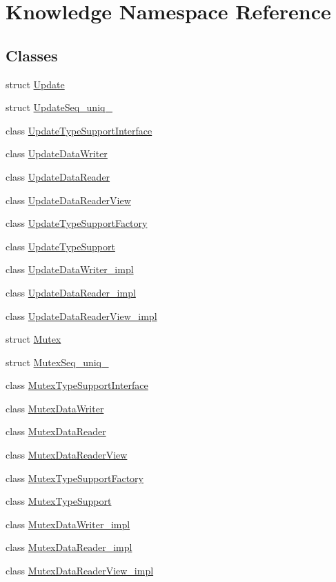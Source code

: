 \hypertarget{namespaceKnowledge}{
\section{Knowledge Namespace Reference}
\label{da/d50/namespaceKnowledge}
}
\subsection*{Classes}
\begin{DoxyCompactItemize}
\item 
struct \hyperlink{structKnowledge_1_1Update}{Update}
\item 
struct \hyperlink{structKnowledge_1_1UpdateSeq__uniq__}{UpdateSeq\_\-uniq\_\-}
\item 
class \hyperlink{classKnowledge_1_1UpdateTypeSupportInterface}{UpdateTypeSupportInterface}
\item 
class \hyperlink{classKnowledge_1_1UpdateDataWriter}{UpdateDataWriter}
\item 
class \hyperlink{classKnowledge_1_1UpdateDataReader}{UpdateDataReader}
\item 
class \hyperlink{classKnowledge_1_1UpdateDataReaderView}{UpdateDataReaderView}
\item 
class \hyperlink{classKnowledge_1_1UpdateTypeSupportFactory}{UpdateTypeSupportFactory}
\item 
class \hyperlink{classKnowledge_1_1UpdateTypeSupport}{UpdateTypeSupport}
\item 
class \hyperlink{classKnowledge_1_1UpdateDataWriter__impl}{UpdateDataWriter\_\-impl}
\item 
class \hyperlink{classKnowledge_1_1UpdateDataReader__impl}{UpdateDataReader\_\-impl}
\item 
class \hyperlink{classKnowledge_1_1UpdateDataReaderView__impl}{UpdateDataReaderView\_\-impl}
\item 
struct \hyperlink{structKnowledge_1_1Mutex}{Mutex}
\item 
struct \hyperlink{structKnowledge_1_1MutexSeq__uniq__}{MutexSeq\_\-uniq\_\-}
\item 
class \hyperlink{classKnowledge_1_1MutexTypeSupportInterface}{MutexTypeSupportInterface}
\item 
class \hyperlink{classKnowledge_1_1MutexDataWriter}{MutexDataWriter}
\item 
class \hyperlink{classKnowledge_1_1MutexDataReader}{MutexDataReader}
\item 
class \hyperlink{classKnowledge_1_1MutexDataReaderView}{MutexDataReaderView}
\item 
class \hyperlink{classKnowledge_1_1MutexTypeSupportFactory}{MutexTypeSupportFactory}
\item 
class \hyperlink{classKnowledge_1_1MutexTypeSupport}{MutexTypeSupport}
\item 
class \hyperlink{classKnowledge_1_1MutexDataWriter__impl}{MutexDataWriter\_\-impl}
\item 
class \hyperlink{classKnowledge_1_1MutexDataReader__impl}{MutexDataReader\_\-impl}
\item 
class \hyperlink{classKnowledge_1_1MutexDataReaderView__impl}{MutexDataReaderView\_\-impl}
\end{DoxyCompactItemize}
